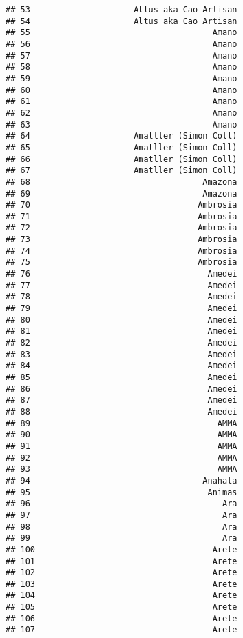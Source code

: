 \documentclass[
]{article}
\begin{document}
\begin{verbatim}
## 53                     Altus aka Cao Artisan
## 54                     Altus aka Cao Artisan
## 55                                     Amano
## 56                                     Amano
## 57                                     Amano
## 58                                     Amano
## 59                                     Amano
## 60                                     Amano
## 61                                     Amano
## 62                                     Amano
## 63                                     Amano
## 64                     Amatller (Simon Coll)
## 65                     Amatller (Simon Coll)
## 66                     Amatller (Simon Coll)
## 67                     Amatller (Simon Coll)
## 68                                   Amazona
## 69                                   Amazona
## 70                                  Ambrosia
## 71                                  Ambrosia
## 72                                  Ambrosia
## 73                                  Ambrosia
## 74                                  Ambrosia
## 75                                  Ambrosia
## 76                                    Amedei
## 77                                    Amedei
## 78                                    Amedei
## 79                                    Amedei
## 80                                    Amedei
## 81                                    Amedei
## 82                                    Amedei
## 83                                    Amedei
## 84                                    Amedei
## 85                                    Amedei
## 86                                    Amedei
## 87                                    Amedei
## 88                                    Amedei
## 89                                      AMMA
## 90                                      AMMA
## 91                                      AMMA
## 92                                      AMMA
## 93                                      AMMA
## 94                                   Anahata
## 95                                    Animas
## 96                                       Ara
## 97                                       Ara
## 98                                       Ara
## 99                                       Ara
## 100                                    Arete
## 101                                    Arete
## 102                                    Arete
## 103                                    Arete
## 104                                    Arete
## 105                                    Arete
## 106                                    Arete
## 107                                    Arete

\end{verbatim}
\end{document}

